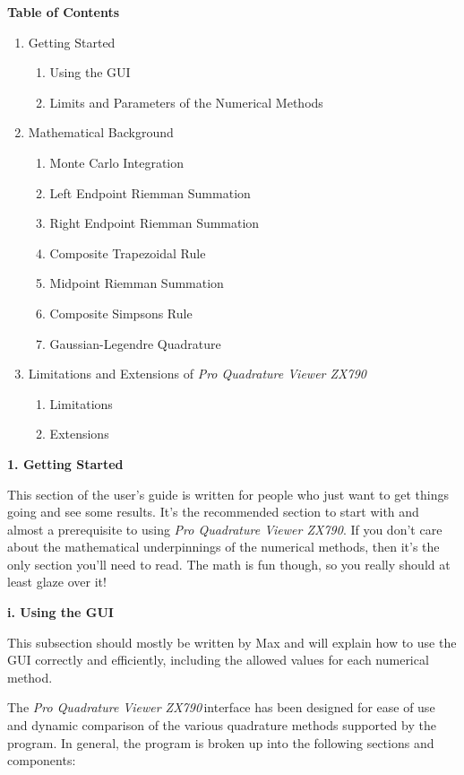 \documentclass[12pt]{article}
\newcommand{\newLine}{\vspace{5mm}}
\newcommand{\appname}{\textit{Pro Quadrature Viewer ZX790}}
\newcommand{\nextsection}[1]{\newpage\noindent\Large\textbf{#1}\vspace{10mm}\normalsize}
\newcommand{\nextsubsection}[1]{\newLine \noindent \large \textbf{#1} \normalsize}
\begin{document}
 
\nextsection{Table of Contents}
\begin{enumerate}[\indent 1.]
\item Getting Started 
	\begin{enumerate}[\indent i.]
	\item Using the GUI
	\item Limits and Parameters of the Numerical Methods
	\end{enumerate}
\item Mathematical Background
	\begin{enumerate}[\indent i.]
	\item Monte Carlo Integration
	\item Left Endpoint Riemman Summation
	\item Right Endpoint Riemman Summation
	\item Composite Trapezoidal Rule
	\item Midpoint Riemman Summation
	\item Composite Simpsons Rule
	\item Gaussian-Legendre Quadrature
	\end{enumerate}
\item Limitations and Extensions of \appname
	\begin{enumerate}[\indent i.]
	\item Limitations
	\item Extensions
	\end{enumerate}
\end{enumerate}



\nextsection{1. Getting Started}

\newLine This section of the user's guide is written for people who just want to get things going and see some results. It's the recommended section to start with and almost a prerequisite to using \appname. If you don't care about the mathematical underpinnings of the numerical methods, then it's the only section you'll need to read. The math is fun though, so you really should at least glaze over it!

\nextsubsection{i. Using the GUI} 

\newLine This subsection should mostly be written by Max and will explain how to use the GUI correctly and efficiently, including the allowed values for each numerical method.

\newLine The \appname \,interface has been designed for ease of use and dynamic comparison of the various quadrature methods supported by the program. In general, the program is broken up into the following sections and components:
\end{document}
